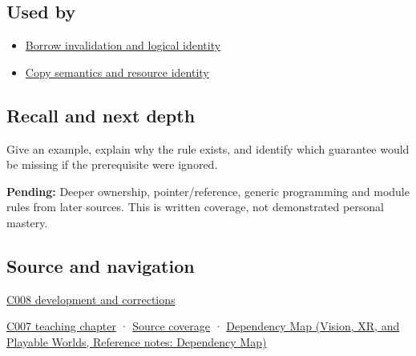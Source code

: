 \subsection{Used by}\label{appendix-f1581457d322-used-by}

\hypertarget{appendix-f1581457d322-used-by}{}

\begin{itemize}
\tightlist
\item
  \hyperref[appendix-f9b8b9188c7f]{Borrow invalidation and logical identity}
\item
  \hyperref[appendix-1340cd1ce582]{Copy semantics and resource identity}
\end{itemize}

\subsection{Recall and next depth}\label{appendix-f1581457d322-recall-and-next-depth}

\hypertarget{appendix-f1581457d322-recall-and-next-depth}{}

Give an example, explain why the rule exists, and identify which guarantee would be missing if the prerequisite were ignored.

\textbf{Pending:} Deeper ownership, pointer/reference, generic programming and module rules from later sources. This is written coverage, not demonstrated personal mastery.

\subsection{Source and navigation}\label{appendix-f1581457d322-source-and-navigation}

\hypertarget{appendix-f1581457d322-source-and-navigation}{}

\hyperref[appendix-fd090d982a15-m008---parts-113-126]{C008 development and corrections}

\hyperref[01-foundations-i-ch002-values-occupants-and-addresses-tell-different-stories]{C007 teaching chapter} · \hyperref[appendix-fd090d982a15-m007---parts-101-112]{Source coverage} · \href{../07-Vision-XR-and-Playable-Worlds/main.pdf\#nameddest=appendix-4ad47bdd269a}{Dependency Map (Vision, XR, and Playable Worlds, Reference notes: Dependency Map)}
